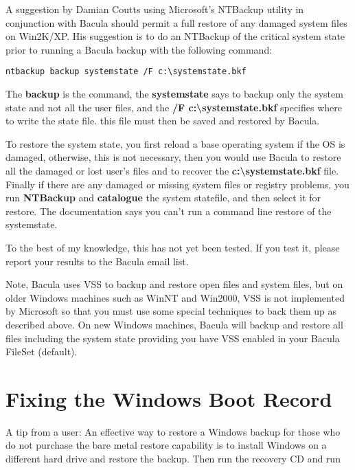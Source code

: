 A suggestion by Damian Coutts using Microsoft's NTBackup utility in
conjunction with Bacula should permit a full restore of any damaged system
files on Win2K/XP. His suggestion is to do an NTBackup of the critical system
state prior to running a Bacula backup with the following command: 

\footnotesize
\begin{verbatim}
ntbackup backup systemstate /F c:\systemstate.bkf
\end{verbatim}
\normalsize

The {\bf backup} is the command, the {\bf systemstate} says to backup only the
system state and not all the user files, and the {\bf /F
c:\textbackslash{}systemstate.bkf} specifies where to write the state file.
this file must then be saved and restored by Bacula. 

To restore the system state, you first reload a base operating system if the
OS is damaged, otherwise, this is not necessary, then you would use Bacula to
restore all the damaged or lost user's files and to recover the {\bf
c:\textbackslash{}systemstate.bkf} file. Finally if there are any damaged or
missing system files or registry problems, you run {\bf NTBackup} and {\bf
catalogue} the system statefile, and then select it for restore. The
documentation says you can't run a command line restore of the systemstate. 

To the best of my knowledge, this has not yet been tested. If you test it,
please report your results to the Bacula email list. 

Note, Bacula uses VSS to backup and restore open files and
system files, but on older Windows machines such as WinNT and
Win2000, VSS is not implemented by Microsoft so that you must
use some special techniques to back them up as described
above.  On new Windows machines, Bacula will backup and restore
all files including the system state providing you have
VSS enabled in your Bacula FileSet (default).

\section{Fixing the Windows Boot Record}
A tip from a user:
An effective way to restore a Windows backup for
those who do not purchase the bare metal restore
capability is to install Windows on a different
hard drive and restore the backup.  Then run the
recovery CD and run

